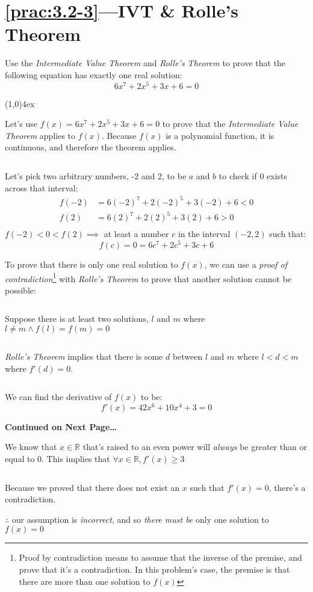 \documentclass{MathNotes}
\newcommand{\continued}{
	\mbox{}
	\vfill
	\textbf{Continued on Next Page\ldots}\newpage
}
\newcommand{\br}{
	\begin{center}
		\line(1,0){4ex}
	\end{center}}
\newcommand{\bl}{
	\newline$ $\newline
}
\begin{document}
\section*{\ref{prac:3.2-3}---IVT \& Rolle's Theorem}\label{ans:3.2-3}
Use the \textit{Intermediate Value Theorem} and \textit{Rolle's Theorem} to
prove that the following equation has exactly one real solution:
$$6x^7+2x^5+3x+6=0$$
\br
Let's use $f(x)=6x^7+2x^5+3x+6=0$ to prove that the \textit{Intermediate
	Value Theorem} applies to $f(x)$. Because $f(x)$ is a polynomial function, it
is continuous, and therefore the theorem applies.
\bl
Let's pick two arbitrary numbers, -2 and 2, to be $a$ and $b$ to check if $0$ exists
across that interval:
\begin{align*}
	f(-2) & =6(-2)^7+2(-2)^5+3(-2)+6 < 0 \\
	f(2)  & =6(2)^7+2(2)^5+3(2)+6 > 0    \\
\end{align*}
$f(-2)<0<f(2)\implies$ at least a number $c$ in the interval $(-2, 2)$ such
that: $$f(c)=0=6c^7+2c^5+3c+6$$

To prove that there is only one real solution to $f(x)$, we can use a
\textit{proof of contradiction}\footnote{Proof by contradiction means to assume
	that the inverse of the premise, and prove that it's a contradiction. In this
	problem's case, the premise is that there are more than one solution to $f(x)$}
with \textit{Rolle's Theorem} to prove that
another solution cannot be possible:
\bl
{}
Suppose there is at least two solutions, $l$ and $m$ where
$l\neq m\land f(l)=f(m)=0$
\bl
\textit{Rolle's Theorem} implies that there is some $d$ between $l$ and $m$
where $l<d<m$ where $f'(d)=0$.
\bl
We can find the derivative of $f(x)$ to be:
$$f'(x)=42x^6+10x^4+3=0$$

\continued
{}
We know that $x\in\mathbb{R}$ that's raised to an even power will
\textit{always} be greater than or equal to 0. This implies that
$\forall x\in\mathbb{R},f'(x)\geq3$
\bl
Because we proved that there does not exist an $x$ such that $f'(x)=0$, there's
a contradiction.

$\therefore$ our assumption is \textit{incorrect}, and so \textit{there must be}
only one solution to $f(x)=0$
\end{document}
